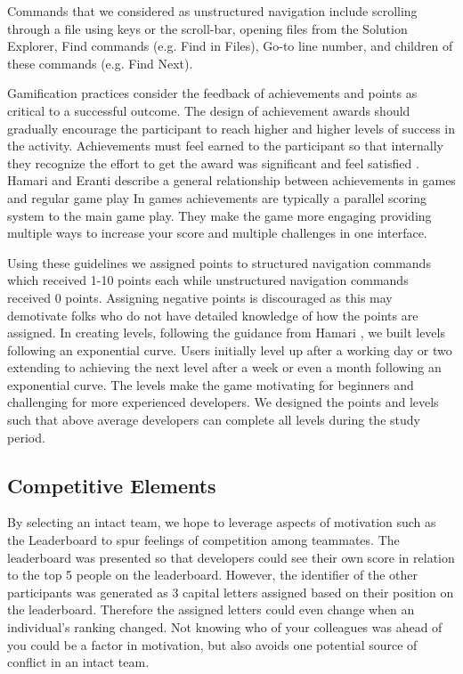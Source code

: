 \documentclass{sig-alternate}
\begin{document}
Commands that we considered as unstructured navigation include scrolling through a file using keys or the scroll-bar, opening files from the Solution Explorer, Find commands (e.g. Find in Files), Go-to line number, and children of these commands (e.g. Find Next).

Gamification practices consider the feedback of achievements and points as critical to a successful outcome.  The design of achievement awards should gradually encourage the participant to reach higher and higher levels of success in the activity.  Achievements must feel earned to the participant so that internally they recognize the effort to get the award was significant and feel satisfied  \cite{wbsnipes:Hamari2011Framework}.  Hamari and Eranti describe a general relationship between achievements in games and regular game play      In games achievements are typically a parallel scoring system to the main game play.  They make the game more engaging providing multiple ways to increase your score and multiple challenges in one interface.

Using these guidelines we assigned points to structured navigation commands which received 1-10 points each while unstructured navigation commands received 0 points.  Assigning negative points is discouraged as this may demotivate folks who do not have detailed knowledge of how the points are assigned.\cite{}   In creating levels, following the guidance from Hamari \cite{wbsnipes:Hamari2011Framework}, we built levels following an exponential curve.  Users initially level up after a working day or two extending to achieving the next level after a week or even a month following an exponential curve.  The levels make the game motivating for beginners and challenging for more experienced developers.  We designed the points and levels such that above average developers can complete all levels during the study period.


\subsection{Competitive Elements}
By selecting an intact team, we hope to leverage aspects of motivation such as the Leaderboard to spur feelings of competition among teammates.    The leaderboard was presented so that developers could see their own score in relation to the top 5 people on the leaderboard.  However, the identifier of the other participants was generated as 3 capital letters assigned based on their position on the leaderboard.  Therefore the assigned letters could even change when an individual's ranking changed.  Not knowing who of your colleagues was ahead of you could be a factor in motivation, but also avoids one potential source of conflict in an intact team.
\end{document}
